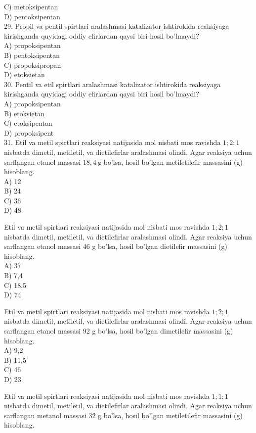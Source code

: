 C) metoksipentan\\
D) pentoksipentan\\
29. Propil va pentil spirtlari aralashmasi katalizator ishtirokida reaksiyaga kirishganda quyidagi oddiy efirlardan qaysi biri hosil bo'lmaydi?\\
A) propoksipentan\\
B) pentoksipentan\\
C) propoksipropan\\
D) etoksietan\\
30. Pentil va etil spirtlari aralashmasi katalizator ishtirokida reaksiyaga kirishganda quyidagi oddiy efirlardan qaysi biri hosil bo'lmaydi?\\
A) propoksipentan\\
B) etoksietan\\
C) etoksipentan\\
D) propoksipent\\
31. Etil va metil spirtlari reaksiyasi natijasida mol nisbati mos ravishda $1 ; 2 ; 1$ nisbatda dimetil, metiletil, va dietilefirlar aralashmasi olindi. Agar reaksiya uchun sarflangan etanol massasi $18,4 \mathrm{~g}$ bo'lsa, hosil bo'lgan metiletilefir massasini (g) hisoblang.\\
A) 12\\
B) 24\\
C) 36\\
D) 48
  \item Etil va metil spirtlari reaksiyasi natijasida mol nisbati mos ravishda $1 ; 2 ; 1$ nisbatda dimetil, metiletil, va dietilefirlar aralashmasi olindi. Agar reaksiya uchun sarflangan etanol massasi 46 g bo'lsa, hosil bo'lgan dietilefir massasini (g) hisoblang.\\
A) 37\\
B) 7,4\\
C) 18,5\\
D) 74
  \item Etil va metil spirtlari reaksiyasi natijasida mol nisbati mos ravishda $1 ; 2 ; 1$ nisbatda dimetil, metiletil, va dietilefirlar aralashmasi olindi. Agar reaksiya uchun sarflangan etanol massasi 92 g bo'lsa, hosil bo'lgan dimetilefir massasini (g) hisoblang.\\
A) 9,2\\
B) 11,5\\
C) 46\\
D) 23
  \item Etil va metil spirtlari reaksiyasi natijasida mol nisbati mos ravishda $1 ; 1 ; 1$ nisbatda dimetil, metiletil, va dietilefirlar aralashmasi olindi. Agar reaksiya uchun sarflangan metanol massasi 32 g bo'lsa, hosil bo'lgan metiletilefir massasini (g) hisoblang.\\
